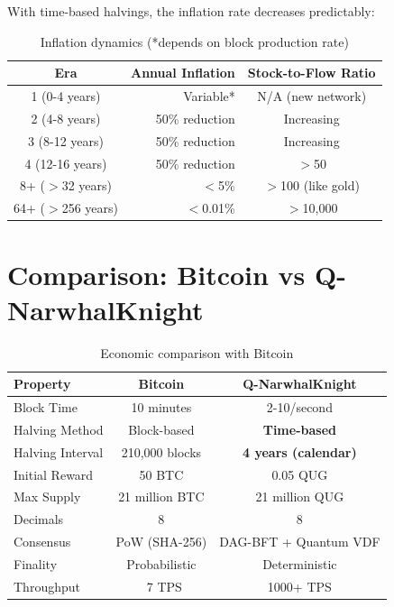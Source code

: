\documentclass[11pt,a4paper]{article}
\begin{document}
With time-based halvings, the inflation rate decreases predictably:

\begin{table}[h]
\centering
\begin{tabular}{crc}
\toprule
\textbf{Era} & \textbf{Annual Inflation} & \textbf{Stock-to-Flow Ratio} \\
\midrule
1 (0-4 years) & Variable* & N/A (new network) \\
2 (4-8 years) & 50\% reduction & Increasing \\
3 (8-12 years) & 50\% reduction & Increasing \\
4 (12-16 years) & 50\% reduction & $>$50 \\
8+ ($>$32 years) & $<$5\% & $>$100 (like gold) \\
64+ ($>$256 years) & $<$0.01\% & $>$10,000 \\
\bottomrule
\end{tabular}
\caption{Inflation dynamics (*depends on block production rate)}
\end{table}

\section{Comparison: Bitcoin vs Q-NarwhalKnight}

\begin{table}[h]
\centering
\small
\begin{tabular}{lcc}
\toprule
\textbf{Property} & \textbf{Bitcoin} & \textbf{Q-NarwhalKnight} \\
\midrule
Block Time & 10 minutes & 2-10/second \\
Halving Method & Block-based & \textbf{Time-based} \\
Halving Interval & 210,000 blocks & \textbf{4 years (calendar)} \\
Initial Reward & 50 BTC & 0.05 QUG \\
Max Supply & 21 million BTC & 21 million QUG \\
Decimals & 8 & 8 \\
Consensus & PoW (SHA-256) & DAG-BFT + Quantum VDF \\
Finality & Probabilistic & Deterministic \\
Throughput & ~7 TPS & 1000+ TPS \\
\bottomrule
\end{tabular}
\caption{Economic comparison with Bitcoin}
\end{table}
\end{document}
